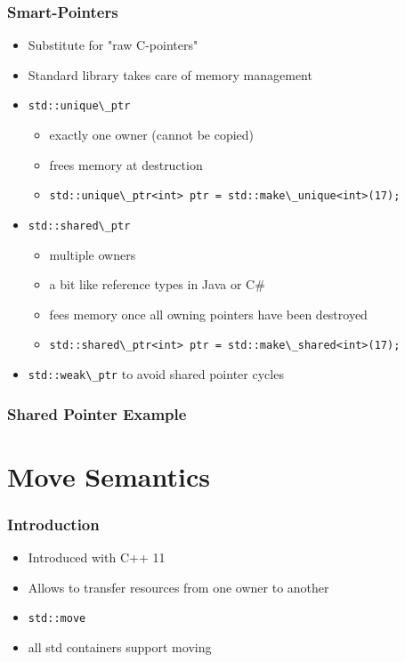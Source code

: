 \documentclass[usenames,dvipsnames,svgnames,table,aspectratio=169]{beamer}
\begin{document}
\begin{frame}
    \frametitle{Smart-Pointers}
    \begin{itemize}
        \item<+-> Substitute for "raw C-pointers"
        \item<+-> Standard library takes care of memory management
        \item<+-> \lstinline{std::unique\_ptr}
        \begin{itemize}
            \item<+-> exactly one owner (cannot be copied) 
            \item<+-> frees memory at destruction
            \item<+-> \lstinline{std::unique\_ptr<int> ptr = std::make\_unique<int>(17);}
        \end{itemize}
        \item<+-> \lstinline{std::shared\_ptr}
        \begin{itemize}
            \item<+-> multiple owners
            \item<+-> a bit like reference types in Java or C\#
            \item<+-> fees memory once all owning pointers have been destroyed
            \item<+-> \lstinline{std::shared\_ptr<int> ptr = std::make\_shared<int>(17);}
        \end{itemize}
        \item<+-> \lstinline{std::weak\_ptr} to avoid shared pointer cycles
    \end{itemize}
\end{frame}

\begin{frame}
    \frametitle{Shared Pointer Example}
    
\end{frame}

\section{Move Semantics}
\begin{frame}
    \frametitle{Introduction}
    \begin{itemize}
        \item<+-> Introduced with C++ 11
        \item<+-> Allows to transfer resources from one owner to another
        \item<+-> \lstinline|std::move|
        \item<+-> all std containers support moving
    \end{itemize}
\end{frame}
\end{document}
